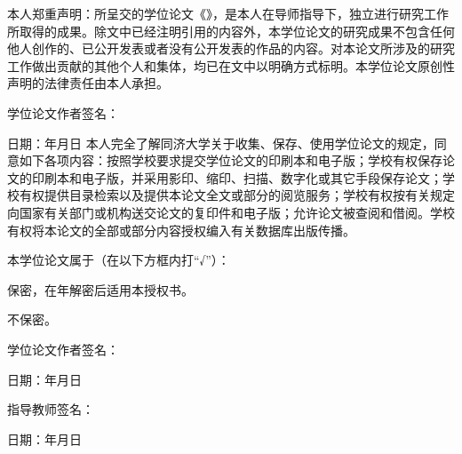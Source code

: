 本人郑重声明：所呈交的学位论文《\ctitle》，是本人在导师指导下，独立进行研究工作所取得的成果。除文中已经注明引用的内容外，本学位论文的研究成果不包含任何他人创作的、已公开发表或者没有公开发表的作品的内容。对本论文所涉及的研究工作做出贡献的其他个人和集体，均已在文中以明确方式标明。本学位论文原创性声明的法律责任由本人承担。
\par\vspace{24bp}
\noindent 学位论文作者签名：\underline{\hspace{4cm}}\par
\vspace{18bp}\noindent 日期：\hspace{1.2cm}年\hspace{.8cm}月\hspace{.8cm}日
\clearpage
{}
本人完全了解同济大学关于收集、保存、使用学位论文的规定，同意如下各项内容：按照学校要求提交学位论文的印刷本和电子版；学校有权保存论文的印刷本和电子版，并采用影印、缩印、扫描、数字化或其它手段保存论文；学校有权提供目录检索以及提供本论文全文或部分的阅览服务；学校有权按有关规定向国家有关部门或机构送交论文的复印件和电子版；允许论文被查阅和借阅。学校有权将本论文的全部或部分内容授权编入有关数据库出版传播。
\par\vspace{12bp}
本学位论文属于（在以下方框内打“√”）：\par
\noindent \tjcheckbox{} 保密，在\underline{\hspace{1.5cm}}年解密后适用本授权书。\par
\noindent \tjcheckbox{} 不保密。\par
\vspace{24bp}
\noindent 学位论文作者签名：\underline{\hspace{2.8cm}}\par
\vspace{12bp}\noindent 日期：\hspace{1.2cm}年\hspace{.8cm}月\hspace{.8cm}日\par
\vspace{24bp}\noindent 指导教师签名：\underline{\hspace{2.8cm}}\par
\vspace{12bp}\noindent 日期：\hspace{1.2cm}年\hspace{.8cm}月\hspace{.8cm}日
\clearpage
